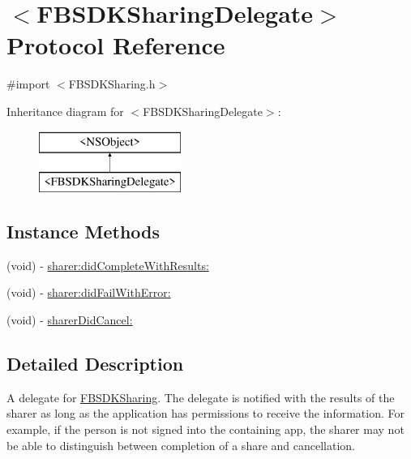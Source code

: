 \hypertarget{protocol_f_b_s_d_k_sharing_delegate-p}{}\section{$<$F\+B\+S\+D\+K\+Sharing\+Delegate$>$ Protocol Reference}
\label{protocol_f_b_s_d_k_sharing_delegate-p}


{\ttfamily \#import $<$F\+B\+S\+D\+K\+Sharing.\+h$>$}

Inheritance diagram for $<$F\+B\+S\+D\+K\+Sharing\+Delegate$>$\+:\begin{figure}[H]
\begin{center}
\leavevmode
\includegraphics[height=2.000000cm]{protocol_f_b_s_d_k_sharing_delegate-p}
\end{center}
\end{figure}
\subsection*{Instance Methods}
\begin{DoxyCompactItemize}
\item 
(void) -\/ \hyperlink{protocol_f_b_s_d_k_sharing_delegate-p_a879c32e66bea7ef374862fb43e5028cc}{sharer\+:did\+Complete\+With\+Results\+:}
\item 
(void) -\/ \hyperlink{protocol_f_b_s_d_k_sharing_delegate-p_a87d7cd26c9915bf4142b041129fe18b7}{sharer\+:did\+Fail\+With\+Error\+:}
\item 
(void) -\/ \hyperlink{protocol_f_b_s_d_k_sharing_delegate-p_a0c1c22ef0c0d8622d124ad3daf777e9e}{sharer\+Did\+Cancel\+:}
\end{DoxyCompactItemize}


\subsection{Detailed Description}
A delegate for \hyperlink{protocol_f_b_s_d_k_sharing-p}{F\+B\+S\+D\+K\+Sharing}.  The delegate is notified with the results of the sharer as long as the application has permissions to receive the information. For example, if the person is not signed into the containing app, the sharer may not be able to distinguish between completion of a share and cancellation. 

